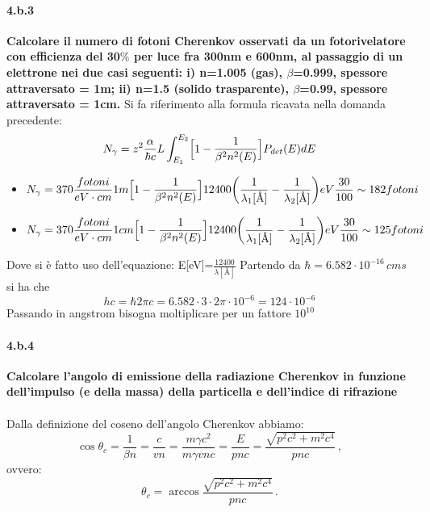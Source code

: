\documentclass[twoside]{article}
\begin{document}
\paragraph{4.b.3}\textbf{Calcolare il numero di fotoni Cherenkov osservati da un fotorivelatore con efficienza del 30$\%$ per luce fra 300nm e 600nm, al passaggio di un elettrone nei due casi seguenti: i) n=1.005 (gas), $\beta$=0.999, spessore attraversato = 1m; ii) n=1.5 (solido trasparente), $\beta$=0.99, spessore attraversato = 1cm.}
Si fa riferimento alla formula ricavata nella domanda precedente:
\begin{equation}
     N_\gamma=z^2 \frac{\alpha}{\hbar c} L \int_{E_1}^{E_2} \Bigl[ 1-\frac{1}{\beta^2 n^2(E)} \Bigr] P_{det}(E)dE 
\end{equation}
\begin{itemize}
    \item \begin{equation}
         N_\gamma=370\frac{fotoni}{eV \cdot cm}1 m\Bigl[1-\frac{1}{\beta^2 n^2(E)} \Bigr]12400\biggl(\frac{1}{\lambda_1[\text{\AA}]}-\frac{1}{\lambda_2[\text{\AA}]}\biggr)eV\frac{30}{100}\sim 182 fotoni
    \end{equation}
     \item \begin{equation}
         N_\gamma=370\frac{fotoni}{eV \cdot cm}1 cm\Bigl[ 1-\frac{1}{\beta^2 n^2(E)} \Bigr]12400\biggl(\frac{1}{\lambda_1[\text{\AA}]}-\frac{1}{\lambda_2[\text{\AA}]}\biggr) eV\frac{30}{100}\sim 125 fotoni
    \end{equation}
\end{itemize}
Dove si è fatto uso dell'equazione: E[eV]=$\frac{12400}{\lambda[\text{\AA}]}$
Partendo da $\hbar=6.582\cdot10^{-16}\,cms$ si ha che 
\begin{equation}
    hc=\hbar2\pi c=6.582\cdot3\cdot2\pi\cdot10^{-6}=124\cdot10^{-6}
\end{equation}
Passando in angstrom bisogna moltiplicare per un fattore $10^{10}$
\paragraph{4.b.4}\textbf{Calcolare l’angolo di emissione della radiazione Cherenkov in funzione dell’impulso (e della massa) della particella e dell’indice di rifrazione}\\ \\
Dalla definizione del coseno dell'angolo Cherenkov abbiamo:
\begin{equation*}
\cos\theta_c=\frac{1}{\beta n}=\frac{c}{vn}=\frac{m\gamma c^2}{m \gamma v n c}=\frac{E}{pnc}=\frac{\sqrt{p^2c^2+m^2c^4}}{pnc} \, ,
\end{equation*}
ovvero:
\begin{equation*}
\theta_c=\arccos \frac{\sqrt{p^2c^2+m^2c^4}}{pnc} \, .
\end{equation*}
\end{document}
